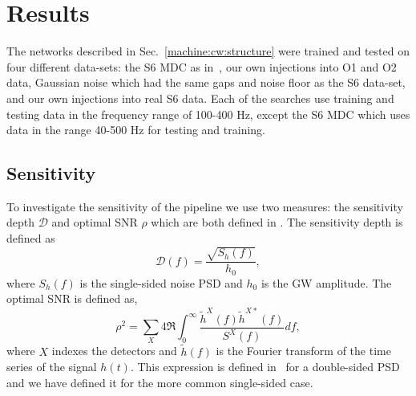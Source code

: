 




\section{\label{machine:results}Results}

%
The networks described in Sec.~\ref{machine:cw:structure} were trained and tested on
four different data-sets: the S6 \gls{MDC} as
in~\citep{bayley2019SOAPGeneralised,walsh2016ComparisonMethods}, our own
injections into O1 and O2 data, Gaussian noise which had the same gaps and noise
floor as the S6 data-set, and our own injections into real S6 data. Each of
the searches use training and testing data in the frequency range of 100-400 Hz,
except the S6 \gls{MDC} which uses data in the range 40-500 Hz for testing and
training. 

\subsection{\label{machine:results:sensitivity} Sensitivity}

%
To investigate the sensitivity of the pipeline we use two measures: the
sensitivity depth $\mathcal{D}$ \cite{prix2007SearchContinuous} and optimal
\gls{SNR} $\rho$ \citep{behnke2015PostprocessingMethods} which are both defined
in \citep{bayley2019SOAPGeneralised}.
The sensitivity depth is defined as
%
\begin{equation}
\label{machine:results:depth}
\mathcal{D}(f) = \frac{\sqrt{S_h(f)}}{h_0},
\end{equation}
%
where $S_h(f)$ is the single-sided noise \gls{PSD} and $h_0$ is the \gls{GW}
amplitude. The optimal \gls{SNR} is defined as,
%
\begin{equation}
\label{machine:results:snr}
\rho^2 = \sum_X 4
\Re\int^{\infty}_{0}\frac{\tilde{h}^X(f)\tilde{h}^{X*}(f)}{S^X(f)}df,
\end{equation}
%
where $X$ indexes the detectors and $\tilde{h}(f)$ is the Fourier transform of
the time series of the signal $h(t)$. This expression is defined
in~\citep{prix2007SearchContinuous} for a double-sided \gls{PSD} and we have
defined it for the more common single-sided case.

